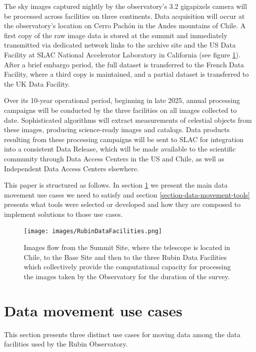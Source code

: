 \documentclass{webofc}
\begin{document}
The sky images captured nightly by the observatory's 3.2 gigapixels camera will be processed across facilities on three continents. Data acquisition will occur at the observatory's location on Cerro Pachón in the Andes mountains of Chile. A first copy of the raw image data is stored at the summit and immediately transmitted via dedicated network links to the archive site and the US Data Facility at SLAC National Accelerator Laboratory in California (see figure \ref{fig:data-facilities}). After a brief embargo period, the full dataset is transferred to the French Data Facility, where a third copy is maintained, and a partial dataset is transferred to the UK Data Facility.

Over its 10-year operational period, beginning in late 2025, annual processing campaigns will be conducted by the three facilities on all images collected to date. Sophisticated algorithms will extract measurements of celestial objects from these images, producing science-ready images and catalogs. Data products resulting from these processing campaigns will be sent to SLAC for integration into a consistent Data Release, which will be made available to the scientific community through Data Access Centers in the US and Chile, as well as Independent Data Access Centers elsewhere.

This paper is structured as follows. In section \ref{section-data-movement-use-cases} we present the main data movement use cases we need to satisfy and section \ref{section-data-movement-tools} presents what tools were selected or developed and how they are composed to implement solutions to those use cases.

\begin{figure}[h]
\texttt{[image: images/RubinDataFacilities.png]}
\caption{Images flow from the Summit Site, where the telescope is located in Chile, to the Base Site and then to the three Rubin Data Facilities which collectively provide the computational capacity for processing the images taken by the Observatory for the duration of the survey.}
\label{fig:data-facilities}
\end{figure}

\section{Data movement use cases}
\label{section-data-movement-use-cases}

This section presents three distinct use cases for moving data among the data facilities used by the Rubin Observatory.
\end{document}
